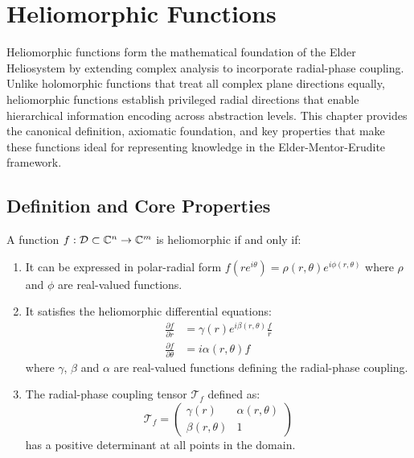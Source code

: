 \chapter{Heliomorphic Functions}

\begin{chapterabstract}
Heliomorphic functions form the mathematical foundation of the Elder Heliosystem by extending complex analysis to incorporate radial-phase coupling. Unlike holomorphic functions that treat all complex plane directions equally, heliomorphic functions establish privileged radial directions that enable hierarchical information encoding across abstraction levels. This chapter provides the canonical definition, axiomatic foundation, and key properties that make these functions ideal for representing knowledge in the Elder-Mentor-Erudite framework.
\end{chapterabstract}

\section{Definition and Core Properties}

\begin{definition}
A function $f: \mathcal{D} \subset \mathbb{C}^n \rightarrow \mathbb{C}^m$ is heliomorphic if and only if:
\begin{enumerate}
    \item It can be expressed in polar-radial form $f(re^{i\theta}) = \rho(r,\theta)e^{i\phi(r,\theta)}$ where $\rho$ and $\phi$ are real-valued functions.
    
    \item It satisfies the heliomorphic differential equations:
    \begin{align}
        \frac{\partial f}{\partial r} &= \gamma(r)e^{i\beta(r,\theta)}\frac{f}{r}\\
        \frac{\partial f}{\partial \theta} &= i\alpha(r,\theta)f
    \end{align}
    where $\gamma$, $\beta$ and $\alpha$ are real-valued functions defining the radial-phase coupling.
    
    \item The radial-phase coupling tensor $\mathcal{T}_f$ defined as:
    \begin{equation}
        \mathcal{T}_f = \begin{pmatrix}
            \gamma(r) & \alpha(r,\theta)\\
            \beta(r,\theta) & 1
        \end{pmatrix}
    \end{equation}
    has a positive determinant at all points in the domain.
\end{enumerate}
\end{definition}

